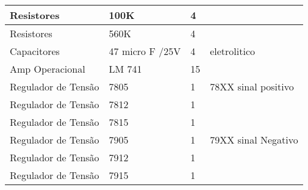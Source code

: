 \begin{table}[H]
\begin{tabular}{|l|l|l|l|}
Resistores                                & 100K                                     & 4                                        &                                   \\ \hline
Resistores                                & 560K                                     & 4                                        &                                   \\ \hline
Capacitores                               & 47 micro F /25V                          & 4                                        & eletrolitico                      \\ \hline
Amp Operacional                           & LM 741                                   & 15                                       &                                   \\ \hline
Regulador de Tensão                       & 7805                                     & 1                                        & 78XX sinal positivo               \\ \hline
Regulador de Tensão                       & 7812                                     & 1                                        &                                   \\ \hline
Regulador de Tensão                       & 7815                                     & 1                                        &                                   \\ \hline
Regulador de Tensão                       & 7905                                     & 1                                        & 79XX sinal Negativo               \\ \hline
Regulador de Tensão                       & 7912                                     & 1                                        &                                   \\ \hline
Regulador de Tensão                       & 7915                                     & 1                                        &                                   \\ \hline
\end{tabular}
\end{table}



